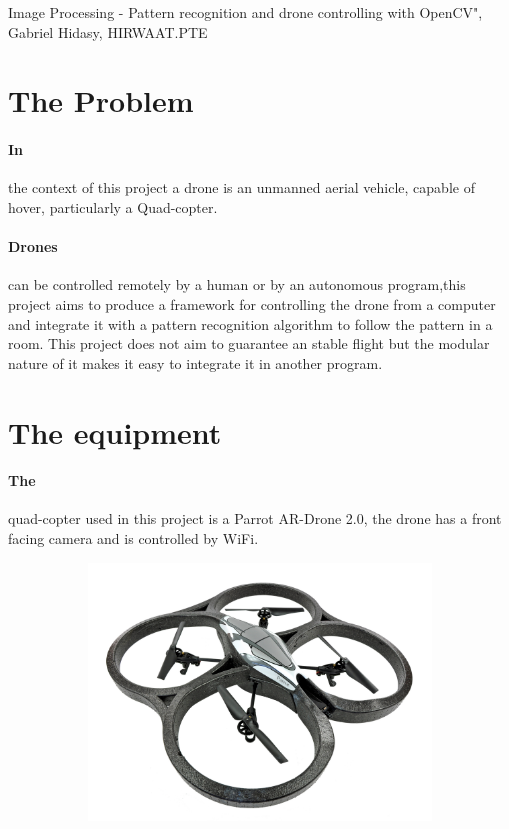 \documentclass[11pt,twoside,a4paper]{article}
\begin{document}
\begin{center}
Image Processing - Pattern recognition and drone controlling with OpenCV",
Gabriel Hidasy, HIRWAAT.PTE
\end{center}

\section{The Problem}
\paragraph {In} the context of this project a drone is an unmanned aerial
vehicle, capable of hover, particularly a Quad-copter.
\paragraph {Drones} can be controlled remotely by a human or by an autonomous
program,this project aims to produce a framework for controlling the drone from
a computer and integrate it with a pattern recognition algorithm to follow the
pattern in a room. This project does not aim to guarantee an stable flight
but the modular nature of it makes it easy to integrate it in another program.

\section{The equipment}
\paragraph {The} quad-copter used in this project is a Parrot AR-Drone 2.0, the
drone has a front facing camera and is controlled by WiFi.
\begin{figure}[hbtp]
  \centering
\begin{subfigure}{.99\textwidth}
  \centering
  \includegraphics[width=.8\linewidth]{drone.jpg}
\end{subfigure}
\end{figure}
\end{document}

